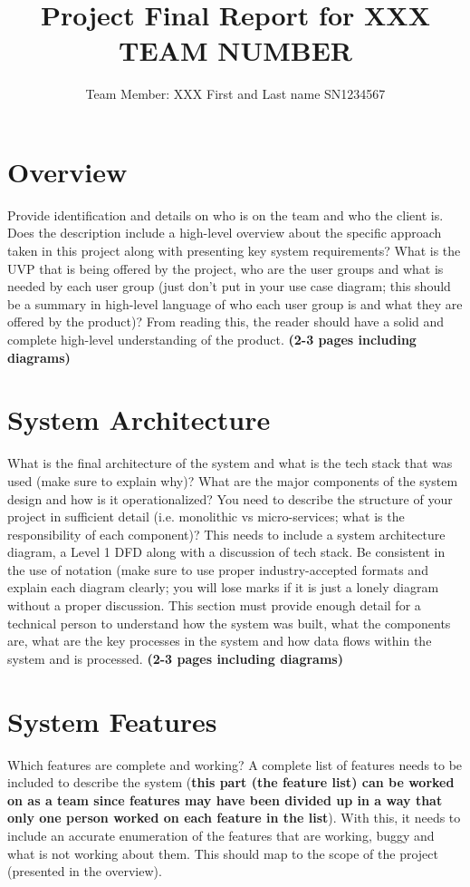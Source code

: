 \documentclass[]{article}
\title{Project Final Report for XXX TEAM NUMBER}
\author{Team Member: XXX First and Last name SN1234567}
\begin{document}
\maketitle

\section{Overview}

Provide identification and details on who is on the team and who the
client is. Does the description include a high-level overview about the
specific approach taken in this project along with presenting key system
requirements? What is the UVP that is being offered by the project, who
are the user groups and what is needed by each user group (just don't
put in your use case diagram; this should be a summary in high-level
language of who each user group is and what they are offered by the
product)? From reading this, the reader should have a solid and complete
high-level understanding of the product. \textbf{(2-3 pages including
diagrams)}

\section{System Architecture}

What is the final architecture of the system and what is the tech stack
that was used (make sure to explain why)? What are the major components
of the system design and how is it operationalized? You need to describe
the structure of your project in sufficient detail (i.e. monolithic vs
micro-services; what is the responsibility of each component)? This
needs to include a system architecture diagram, a Level 1 DFD along with
a discussion of tech stack. Be consistent in the use of notation (make
sure to use proper industry-accepted formats and explain each diagram
clearly; you will lose marks if it is just a lonely diagram without a
proper discussion. This section must provide enough detail for a
technical person to understand how the system was built, what the
components are, what are the key processes in the system and how data
flows within the system and is processed. \textbf{(2-3 pages including
diagrams)}

\section{System Features}

Which features are complete and working? A complete list of features
needs to be included to describe the system (\textbf{this part (the
feature list) can be worked on as a team since features may have been
divided up in a way that only one person worked on each feature in the
list}). With this, it needs to include an accurate enumeration of the
features that are working, buggy and what is not working about them.
This should map to the scope of the project (presented in the overview).
\end{document}
